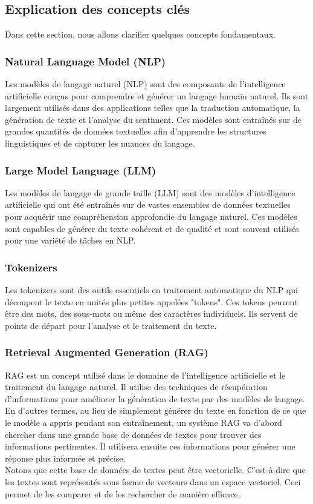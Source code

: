 \subsection{Explication des concepts clés}
\justifying
Dans cette section, nous allons clarifier quelques concepts fondamentaux.

\subsubsection{Natural Language Model (NLP)}
\justifying
Les modèles de langage naturel (NLP) sont des composants de l'intelligence artificielle conçus pour comprendre et générer un langage humain naturel. Ils sont largement utilisés dans des applications telles que la traduction automatique, la génération de texte et l'analyse du sentiment. Ces modèles sont entraînés sur de grandes quantités de données textuelles afin d'apprendre les structures linguistiques et de capturer les nuances du langage.

\subsubsection{Large Model Language (LLM)}
\justifying
Les modèles de langage de grande taille (LLM) sont des modèles d'intelligence artificielle qui ont été entraînés sur de vastes ensembles de données textuelles pour acquérir une compréhension approfondie du langage naturel. Ces modèles sont capables de générer du texte cohérent et de qualité et sont souvent utilisés pour une variété de tâches en NLP.

\subsubsection{Tokenizers  }
\justifying
Les tokenizers sont des outils essentiels en traitement automatique du NLP qui découpent le texte en unités plus petites appelées "tokens". Ces tokens peuvent être des mots, des sous-mots ou même des caractères individuels. Ils servent de points de départ pour l'analyse et le traitement du texte.

\subsubsection{Retrieval Augmented Generation (RAG) }
RAG est un concept utilisé dans le domaine de l'intelligence artificielle et le traitement du langage naturel. Il utilise des techniques de récupération d'informations pour améliorer la génération de texte par des modèles de langage. \\
En d'autres termes, au lieu de simplement générer du texte en fonction de ce que le modèle a appris pendant son entraînement, un système RAG va d'abord chercher dans une grande base de données de textes pour trouver des informations pertinentes. Il utilisera ensuite ces informations pour générer une réponse plus informée et précise.\\
Notons que cette base de données de textes peut être vectorielle. C'est-à-dire que les textes sont représentés sous forme de vecteurs dans un espace vectoriel. Ceci permet de les comparer et de les rechercher de manière efficace.

